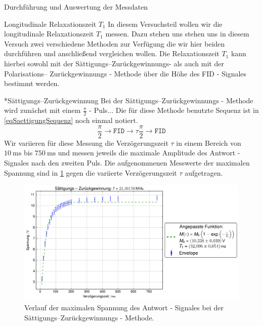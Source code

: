 \documentclass[pdftex, a4paper,11pt, twoside, ngerman]{report}
\begin{document}
\begin{chapter}{Durchführung und Auswertung der Messdaten}
    
    
    \begin{section}{
        Longitudinale Relaxationszeit $T_{1}$}
      \label{chpLongRelax}
      In diesem Versuchsteil wollen wir die longitudinale Relaxationszeit
      $T_{1}$ messen.
      Dazu stehen uns stehen uns in diesem Versuch zwei verschiedene Methoden
      zur Verfügung die wir hier beiden durchführen und anschließend
      vergleichen wollen.
      Die Relaxationszeit $T_{1}$ kann hierbei sowohl mit der
      Sättigungs--Zurückgewinnungs- als auch mit der Polarisations--
      Zurückgewinnungs - Methode über die Höhe des FID - Signales bestimmt werden.
      
      
      \begin{subsection}*{Sättigungs--Zurückgewinnung}
        \label{chpLongRelaxSaettigung}
        Bei der Sättigungs--Zurückgewinnungs - Methode wird zunächst mit einem
        $\frac{\pi}{2}$ - Puls...
        Die für diese Methode benutzte Sequenz ist in \cref{eqSaettigungSequenz}
        noch einmal notiert.
        \begin{equation}
          \label{eqSaettigungSequenz}
          \frac{\pi}{2} \rightarrow \mathtt{FID} \rightarrow
          \tau \frac{\pi}{2} \rightarrow \mathtt{FID}
        \end{equation}
        Wir variieren für diese Messung die Verzögerungszeit $\tau$ in einem
        Bereich von $\SI{10}{\milli\second}$ bis $\SI{750}{\milli\second}$
        und messen jeweils die maximale Amplitude des Antwort - Signales nach
        den zweiten Puls.
        Die aufgenommenen Messwerte der maximalen Spannung sind in
        \cref{figSaettigung} gegen die variierte Verzögerungszeit $\tau$
        aufgetragen.
        \begin{figure}[htb]
          \centering
          \includegraphics[width=\textwidth]
          {Figures/SaettigungsZurueckgewinnung.png}
          \caption{Verlauf der maximalen Spannung des Antwort - Signales bei der
            Sättigungs--Zurückgewinnungs - Methode.}
          \label{figSaettigung}
        \end{figure}
        

\end{subsection}
\end{section}
\end{chapter}
\end{document}
